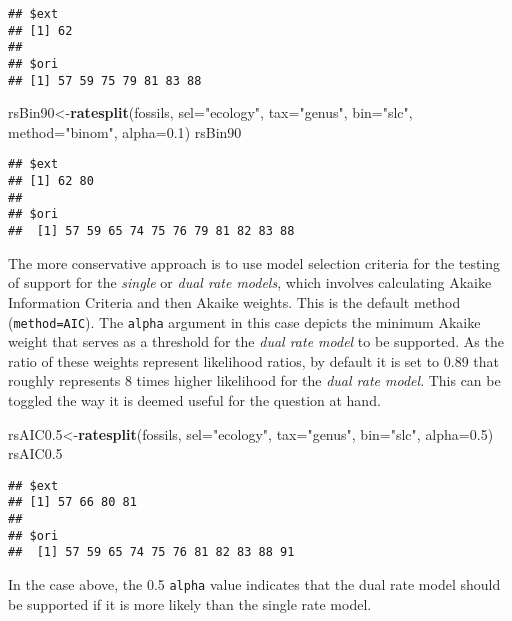 \documentclass[]{article}
\newenvironment{Shaded}{\begin{snugshade}}{\end{snugshade}}
\newcommand{\DataTypeTok}[1]{\textcolor[rgb]{0.13,0.29,0.53}{#1}}
\newcommand{\FloatTok}[1]{\textcolor[rgb]{0.00,0.00,0.81}{#1}}
\newcommand{\KeywordTok}[1]{\textcolor[rgb]{0.13,0.29,0.53}{\textbf{#1}}}
\newcommand{\NormalTok}[1]{#1}
\newcommand{\StringTok}[1]{\textcolor[rgb]{0.31,0.60,0.02}{#1}}
\begin{document}
\begin{verbatim}
## $ext
## [1] 62
## 
## $ori
## [1] 57 59 75 79 81 83 88
\end{verbatim}

\begin{Shaded}
\begin{Highlighting}[]
\NormalTok{rsBin90<-}\KeywordTok{ratesplit}\NormalTok{(fossils, }\DataTypeTok{sel=}\StringTok{"ecology"}\NormalTok{, }\DataTypeTok{tax=}\StringTok{"genus"}\NormalTok{, }
  \DataTypeTok{bin=}\StringTok{"slc"}\NormalTok{, }\DataTypeTok{method=}\StringTok{"binom"}\NormalTok{, }\DataTypeTok{alpha=}\FloatTok{0.1}\NormalTok{)}
\NormalTok{rsBin90}
\end{Highlighting}
\end{Shaded}

\begin{verbatim}
## $ext
## [1] 62 80
## 
## $ori
##  [1] 57 59 65 74 75 76 79 81 82 83 88
\end{verbatim}

The more conservative approach is to use model selection criteria for
the testing of support for the \emph{single } or \emph{dual rate
models}, which involves calculating Akaike Information Criteria and then
Akaike weights. This is the default method (\texttt{method=AIC}). The
\texttt{alpha} argument in this case depicts the minimum Akaike weight
that serves as a threshold for the \emph{dual rate model} to be
supported. As the ratio of these weights represent likelihood ratios, by
default it is set to 0.89 that roughly represents 8 times higher
likelihood for the \emph{dual rate model}. This can be toggled the way
it is deemed useful for the question at hand.

\begin{Shaded}
\begin{Highlighting}[]
\NormalTok{rsAIC0}\FloatTok{.5}\NormalTok{<-}\KeywordTok{ratesplit}\NormalTok{(fossils, }\DataTypeTok{sel=}\StringTok{"ecology"}\NormalTok{, }\DataTypeTok{tax=}\StringTok{"genus"}\NormalTok{, }
  \DataTypeTok{bin=}\StringTok{"slc"}\NormalTok{, }\DataTypeTok{alpha=}\FloatTok{0.5}\NormalTok{)}
\NormalTok{rsAIC0}\FloatTok{.5}
\end{Highlighting}
\end{Shaded}

\begin{verbatim}
## $ext
## [1] 57 66 80 81
## 
## $ori
##  [1] 57 59 65 74 75 76 81 82 83 88 91
\end{verbatim}

In the case above, the 0.5 \texttt{alpha} value indicates that the dual
rate model should be supported if it is more likely than the single rate
model.
\end{document}
